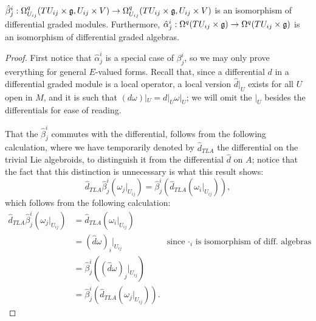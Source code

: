 \begin{theorem}\label{theoremHatAlphaRespectsDifferentialAndWedgeIsomorphismOfModulesAndAlgebra}
$\hat \beta^i_j: \Omega_{U_{ij}}^q(TU_{ij}\times \mathfrak{g}, U_{ij}\times V) \to \Omega_{U_{ij}}^q(TU_{ij}\times \mathfrak{g}, U_{ij}\times V)$ is an isomorphism of differential graded modules. Furthermore, $\hat \alpha^i_j: \Omega^q(TU_{ij}\times \mathfrak{g}) \to \Omega^q(TU_{ij}\times \mathfrak{g})$ is an isomorphism of differential graded algebras.
\end{theorem}
\begin{proof}
First notice that $\hat \alpha^i_j$ is a special case of $\beta^i_j$, so we may only prove everything for general $E$-valued forms. Recall that, since a differential $d$ in a differential graded module is a local operator, a local version $\hat d|_U$ exists for all $U$ open in $M$, and it is such that $(d\omega)|_U = d|_U \omega|_U$; we will omit the $|_U$ besides the differentials for ease of reading.

That the $\hat \beta^i_j$ commutes with the differential, follows from the following calculation, where we have temporarily denoted by $\hat d_{TLA}$ the differential on the trivial Lie algebroids, to distinguish it from the differential $\hat d$ on $A$; notice that the fact that this distinction is unnecessary is what this result shows:
\begin{equation*}
    \hat d_{TLA} \hat \beta^i_j(\omega_j|_{U_{ij}}) = \hat \beta^i_j(\hat d_{TLA} (\omega_i|_{U_{ij}})),
\end{equation*} which follows from the following calculation:
\begin{align*}
    \hat d_{TLA} \hat \beta^i_j(\omega_j|_{U_{ij}})
    &= \hat d_{TLA} (\omega_i|_{U_{ij}}) \\
    &= (\hat d \omega)_i|_{U_{ij}} & \text{since $\cdot_{i}$ is isomorphism of diff. algebras}\\
    &= \hat \beta^i_j((\hat d \omega)_j|_{U_{ij}}) \\
    &= \hat \beta^i_j(\hat d_{TLA} (\omega_j|_{U_{ij}})).
\end{align*}


\end{proof}
